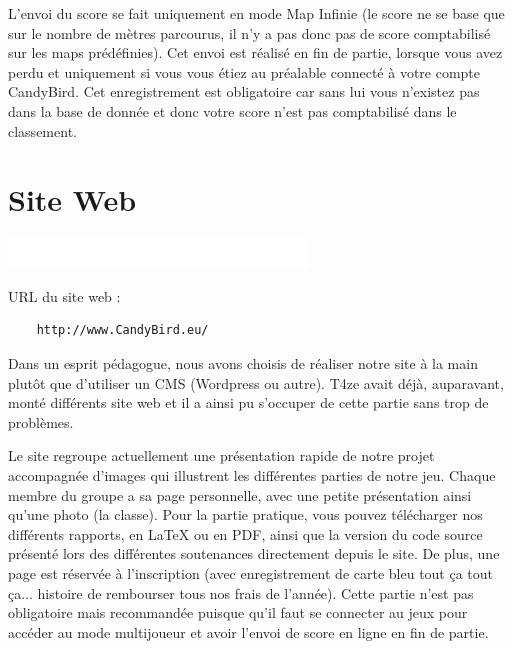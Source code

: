 \documentclass [11pt]{report}
\begin{document}
	
	
	\vspace{10mm}

	L'envoi du score se fait uniquement en mode Map Infinie (le score ne se base que sur le nombre de mètres parcourus, il n'y a pas donc pas de score comptabilisé sur les maps prédéfinies). Cet envoi est réalisé en fin de partie, lorsque vous avez perdu et uniquement si vous vous étiez au préalable connecté à votre compte CandyBird. Cet enregistrement est obligatoire car sans lui vous n'existez pas dans la base de donnée et donc votre score n'est pas comptabilisé dans le classement.
	 
	 \newpage
	 
	\section{Site Web}
	
	\begin{center}
				\includegraphics[scale = 0.3]{images/blanc.png}
			\end{center}
	
	\noindent URL du site web : 
	\begin{Verbatim}
	http://www.CandyBird.eu/
	\end{Verbatim}
	
	\vspace{6mm}
	
	Dans un esprit pédagogue, nous avons choisis de réaliser notre site à la main plutôt que d'utiliser un CMS (Wordpress ou autre). T4ze avait déjà, auparavant, monté différents site web et il a ainsi pu s'occuper de cette partie sans trop de problèmes.
	
	Le site regroupe actuellement une présentation rapide de notre projet accompagnée d'images qui illustrent les différentes parties de notre jeu. Chaque membre du groupe a sa page personnelle, avec une petite présentation ainsi qu'une photo (la classe). Pour la partie pratique, vous pouvez télécharger nos différents rapports, en LaTeX ou en PDF, ainsi que la version du code source présenté lors des différentes soutenances directement depuis le site. De plus, une page est réservée à l'inscription (avec enregistrement de carte bleu tout ça tout ça... histoire de rembourser tous nos frais de l'année). Cette partie n'est pas obligatoire mais recommandée puisque qu'il faut se connecter au jeux pour accéder au mode multijoueur et avoir l'envoi de score en ligne en fin de partie.\\
	\vspace{4mm}
	
\end{document}
